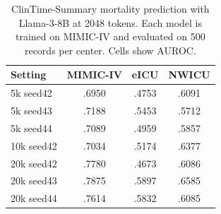 \begin{table}[t]
\caption{ClinTime-Summary mortality prediction with Llama-3-8B at 2048 tokens. Each model is trained on MIMIC-IV and evaluated on 500 records per center. Cells show AUROC.}
\label{tab:summary_mortality}
\centering
\small
\setlength{\tabcolsep}{3.4pt}
\begin{tabular}{lccc}
\toprule
Setting & MIMIC-IV & eICU & NWICU \\
\midrule
5k seed42 & .6950 & .4753 & .6091 \\
5k seed43 & .7188 & .5453 & .5712 \\
5k seed44 & .7089 & .4959 & .5857 \\
10k seed42 & .7034 & .5174 & .6377 \\
20k seed42 & .7780 & .4673 & .6086 \\
20k seed43 & .7875 & .5897 & .6585 \\
20k seed44 & .7614 & .5832 & .6085 \\
\bottomrule
\end{tabular}
\end{table}
